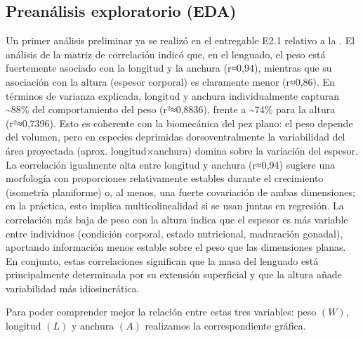 \documentclass[a4paper,10pt,spanish]{jupyterBook}
\begin{document}
\subsection{Preanálisis exploratorio (EDA)}
\label{\detokenize{content/03/Analisis:preanalisis-exploratorio-eda}}
\sphinxAtStartPar
Un primer análisis preliminar ya se realizó en el entregable E2.1 relativo a la {\hyperref[\detokenize{content/02/Dataset::doc}]{}}. El análisis de la matriz de correlación indicó que, en el lenguado, el peso está fuertemente asociado con la longitud y la anchura (r≈0,94), mientras que su asociación con la altura (espesor corporal) es claramente menor (r≈0,86). En términos de varianza explicada, longitud y anchura individualmente capturan \textasciitilde{}88\% del comportamiento del peso (r²≈0,8836), frente a \textasciitilde{}74\% para la altura (r²≈0,7396). Esto es coherente con la biomecánica del pez plano: el peso depende del volumen, pero en especies deprimidas dorsoventralmente la variabilidad del área proyectada (aprox. longitud×anchura) domina sobre la variación del espesor. La correlación igualmente alta entre longitud y anchura (r≈0,94) sugiere una morfología con proporciones relativamente estables durante el crecimiento (isometría planiforme) o, al menos, una fuerte covariación de ambas dimensiones; en la práctica, esto implica multicolinealidad si se usan juntas en regresión. La correlación más baja de peso con la altura indica que el espesor es más variable entre individuos (condición corporal, estado nutricional, maduración gonadal), aportando información menos estable sobre el peso que las dimensiones planas. En conjunto, estas correlaciones significan que la masa del lenguado está principalmente determinada por su extensión superficial y que la altura añade variabilidad más idiosincrática.

\sphinxAtStartPar
Para poder comprender mejor la relación entre estas tres variables: peso \((W)\), longitud \((L)\) y anchura \((A)\) realizamos la correspondiente gráfica.
\end{document}
